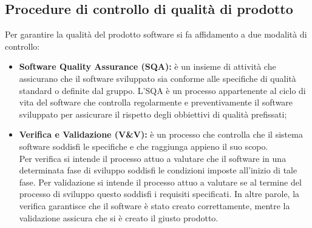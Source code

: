 	\subsection{Procedure di controllo di qualità di prodotto}
	Per garantire la qualità del prodotto software si fa affidamento a due modalità di controllo:
		\begin{itemize}
			\item \textbf{Software Quality Assurance (SQA):} è un insieme di attività che assicurano che il software sviluppato sia conforme alle specifiche di qualità standard o definite dal gruppo. L'SQA è un processo appartenente al ciclo di vita del software che controlla regolarmente e preventivamente il software sviluppato per assicurare il rispetto degli obbiettivi di qualità prefissati;
			\item \textbf{Verifica e Validazione (V\&V):} è un processo che controlla che il sistema software soddisfi le specifiche e che raggiunga appieno il suo scopo.\\
			Per verifica si intende il processo attuo a valutare che il software in una determinata fase di sviluppo soddisfi le condizioni imposte all'inizio di tale fase. Per validazione si intende il processo attuo a valutare se al termine del processo di sviluppo questo soddisfi i requisiti specificati. In altre parole, la verifica garantisce che il software è stato creato correttamente, mentre la validazione assicura che si è creato il giusto prodotto.
		\end{itemize}
	
	\pagebreak